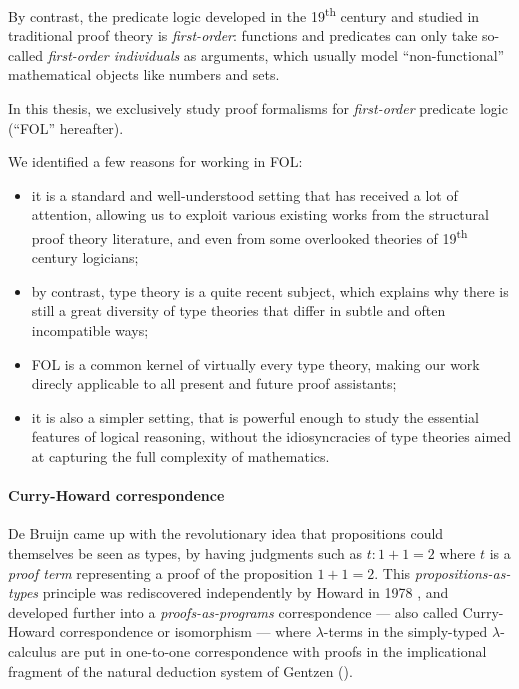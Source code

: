 By contrast, the predicate logic developed in the 19\textsuperscript{th} century
and studied in traditional proof theory is \emph{first-order}: functions and
predicates can only take so-called \emph{first-order individuals} as arguments,
which usually model ``non-functional'' mathematical objects like numbers and
sets.

\begin{emphpar}
In this thesis, we exclusively study proof formalisms for \emph{first-order}
predicate logic (``FOL'' hereafter).
\end{emphpar}

We identified a few reasons for working in FOL:
\begin{itemize}
  \item it is a standard and well-understood setting that has received a lot of
  attention, allowing us to exploit various existing works from the structural
  proof theory literature, and even from some overlooked theories of
  19\textsuperscript{th} century logicians;
  \item by contrast, type theory is a quite recent subject, which explains why there is still a
  great diversity of type theories that differ in subtle and often incompatible
  ways;
  \item FOL is a common kernel of virtually every type theory, making our work
  direcly applicable to all present and future proof assistants;
  \item it is also a simpler setting, that is powerful enough to study the
  essential features of logical reasoning, without the idiosyncracies of type
  theories aimed at capturing the full complexity of mathematics.
\end{itemize}

\paragraph{Curry-Howard correspondence}

De Bruijn came up with the revolutionary idea that propositions could themselves
be seen as types, by having judgments such as $t : 1 + 1 = 2$ where $t$ is a
\emph{proof term} representing a proof of the proposition $1 + 1 = 2$. This
\emph{propositions-as-types} principle was rediscovered independently by Howard
in 1978 , and developed further into a
\emph{proofs-as-programs} correspondence --- also called Curry-Howard
correspondence or isomorphism --- where
$\lambda$-terms in the simply-typed $\lambda$-calculus are put in one-to-one
correspondence with proofs in the implicational fragment of the natural
deduction system  of Gentzen ().

